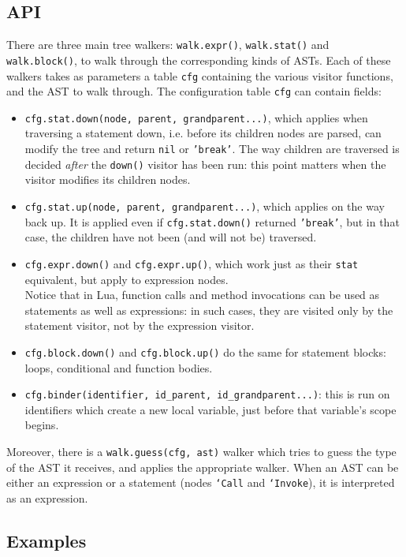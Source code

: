 \subsection{API}
There are three main tree walkers: {\tt walk.expr()}, {\tt walk.stat()} and {\tt
  walk.block()}, to walk through the corresponding kinds of ASTs. Each of these
walkers takes as parameters a table {\tt cfg} containing the various visitor
functions, and the AST to walk through. The configuration table {\tt cfg} can
contain fields:
\begin{itemize}
\item {\tt cfg.stat.down(node, parent, grandparent...)}, which applies when
  traversing a statement down, i.e. before its children nodes are parsed,
  can modify the tree and return {\tt nil} or {\tt'break'}. The way children
  are traversed is decided {\em after} the {\tt down()} visitor has been run:
  this point matters when the visitor modifies its children nodes.
\item {\tt cfg.stat.up(node, parent, grandparent...)}, which applies on the
  way back up. It is applied even if {\tt cfg.stat.down()} returned
  {\tt'break'}, but in that case, the children have not been (and will not be)
  traversed. 
\item {\tt cfg.expr.down()} and {\tt cfg.expr.up()}, which work just as their
  {\tt stat} equivalent, but apply to expression nodes.\\
  Notice that in Lua, function calls and method invocations can be used as
  statements as well as expressions: in such cases, they are visited only by
  the statement visitor, not by the expression visitor.
\item {\tt cfg.block.down()} and {\tt cfg.block.up()} do the same for statement
  blocks: loops, conditional and function bodies.
\item {\tt cfg.binder(identifier, id\_parent, id\_grandparent...)}: this
  is run on identifiers which create a new local variable, just before that
  variable's scope begins.
\end{itemize}

Moreover, there is a {\tt walk.guess(cfg, ast)} walker which tries to guess the
type of the AST it receives, and applies the appropriate walker. When an AST can
be either an expression or a statement (nodes {\tt`Call} and {\tt`Invoke}), it
is interpreted as an expression.

\subsection{Examples}

